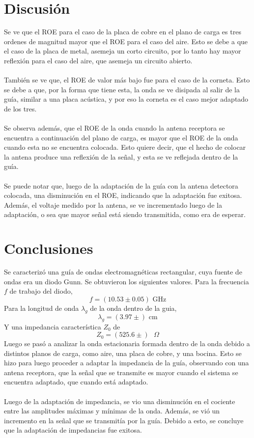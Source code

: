 \documentclass[11pt,a4paper]{article}
\begin{document}
\begin{multicols}{2}
\section{Discusión}
Se ve que el ROE para el caso de la placa de cobre en el plano de carga es tres ordenes de magnitud mayor que el ROE para el caso del aire. Esto se debe a que el caso de la placa de metal, asemeja un corto circuito, por lo tanto hay mayor reflexión para el caso del aire, que asemeja un circuito abierto. \\ \\
También se ve que, el ROE de valor más bajo fue para el caso de la corneta. Esto se debe a que, por la forma que tiene esta, la onda se ve disipada al salir de la guía, similar a una placa acústica, y por eso la corneta es el caso mejor adaptado de los tres. \\ \\
Se observa además, que el ROE de la onda cuando la antena receptora se encuentra a continuación del plano de carga, es mayor que el ROE de la onda cuando esta no se encuentra colocada. Esto quiere decir, que el hecho de colocar la antena produce una reflexión de la señal, y esta se ve reflejada dentro de la guía. \\ \\
Se puede notar que, luego de la adaptación de la guía con la antena detectora colocada, una disminución en el ROE, indicando que la adaptación fue exitosa. Además, el voltaje medido por la antena, se ve incrementado luego de la adaptación, o sea que mayor señal está siendo transmitida, como era de esperar.
\section{Conclusiones}

Se caracterizó una guía de ondas electromagnéticas rectangular, cuya fuente de ondas era un diodo Gunn. Se obtuvieron los siguientes valores. Para la frecuencia $f$ de trabajo del diodo,
$$
f=(10.53\pm 0.05) \text{ GHz}
$$
Para la longitud de onda $\lambda_g$ de la onda dentro de la guia,
$$
\lambda_g = (3.97\pm ) \text{ cm}
$$
Y una impedancia característica $Z_0$ de
$$
Z_0 = (525.6 \pm ) \text{ } \Omega
$$
Luego se pasó a analizar la onda estacionaria formada dentro de la onda debido a distintos planos de carga, como aire, una placa de cobre, y una bocina. Esto se hizo para luego proceder a adaptar la impedancia de la guía, observando con una antena receptora, que la señal que se transmite es mayor cuando el sistema se encuentra adaptado, que cuando está adaptado. \\ \\
Luego de la adaptación de impedancia, se vio una disminución en el cociente entre las amplitudes máximas y mínimas de la onda. Además, se vió un incremento en la señal que se transmitía por la guía. Debido a esto, se concluye que la adaptación de impedancias fue exitosa. \\ \\





\end{multicols}
\end{document}

